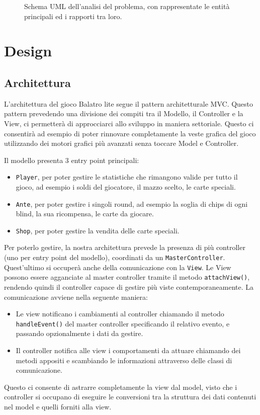 \documentclass[a4paper,12pt]{report}
\begin{document}
\begin{figure}[H]
	\centering{}
	
	\caption{Schema UML dell’analisi del problema, con rappresentate le entità principali ed i rapporti tra loro.}
	\label{img:analisi}
\end{figure}

\chapter{Design}

\section{Architettura}
L’architettura del gioco Balatro lite segue il pattern architetturale MVC.
Questo pattern prevedendo una divisione dei compiti tra il Modello, il Controller e la View, ci permetterà di approcciarci allo sviluppo in maniera settoriale.
Questo ci consentirà ad esempio di poter rinnovare completamente la veste grafica del gioco utilizzando dei motori grafici più avanzati senza toccare Model e Controller.

Il modello presenta 3 entry point principali:
\begin{itemize}
	\item \texttt{Player}, per poter gestire le statistiche che rimangono valide per tutto il gioco, ad esempio i soldi del giocatore, il mazzo scelto, le carte speciali.
	\item \texttt{Ante}, per poter gestire i singoli round, ad esempio la soglia di chips di ogni blind, la sua ricompensa, le carte da giocare.
	\item \texttt{Shop}, per poter gestire la vendita delle carte speciali. 
\end{itemize}
Per poterlo gestire, la nostra architettura prevede la presenza di più controller (uno per entry point del modello), coordinati da un \texttt{MasterController}. Quest’ultimo si occuperà anche della comunicazione con la \texttt{View}.
Le View possono essere agganciate al master controller tramite il metodo \texttt{attachView()}, rendendo quindi il controller capace di gestire più viste contemporaneamente. La comunicazione avviene nella seguente maniera:
\begin{itemize}
	\item Le view notificano i cambiamenti al controller chiamando il metodo \texttt{handleEvent()} del master controller specificando il relativo evento, e passando opzionalmente i dati da gestire.
	\item Il controller notifica alle view i comportamenti da attuare chiamando dei metodi appositi e scambiando le informazioni attraverso delle classi di comunicazione.
\end{itemize}
Questo ci consente di astrarre completamente la view dal model, visto che i controller si occupano di eseguire le conversioni tra la struttura dei dati contenuti nel model e quelli forniti alla view. 
\end{document}
